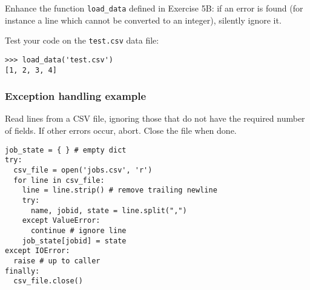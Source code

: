 \documentclass[english,serif,mathserif,xcolor=pdftex,dvipsnames,table]{beamer}
\begin{document}
\begin{frame}[fragile]
  \begin{exercise}
    Enhance the function \lstinline|load_data| defined in Exercise 5B:
    if an error is found (for instance a line which cannot be converted to
    an integer), silently ignore it.

    Test your code on the \texttt{test.csv} data file:
\begin{lstlisting}
>>> load_data('test.csv')
[1, 2, 3, 4]
\end{lstlisting}
  \end{exercise}


\end{frame}


\begin{frame}[fragile]
  \frametitle{Exception handling example}

Read lines from a CSV file, ignoring those that do not have the
required number of fields.  If other errors occur, abort.
Close the file when done.
\begin{lstlisting}
job_state = { } # empty dict
try:
  csv_file = open('jobs.csv', 'r')
  for line in csv_file:
    line = line.strip() # remove trailing newline
    try:
      name, jobid, state = line.split(",")
    except ValueError:
      continue # ignore line
    job_state[jobid] = state
except IOError:
  raise # up to caller
finally:
  csv_file.close()
\end{lstlisting}
\end{frame}
\end{document}
